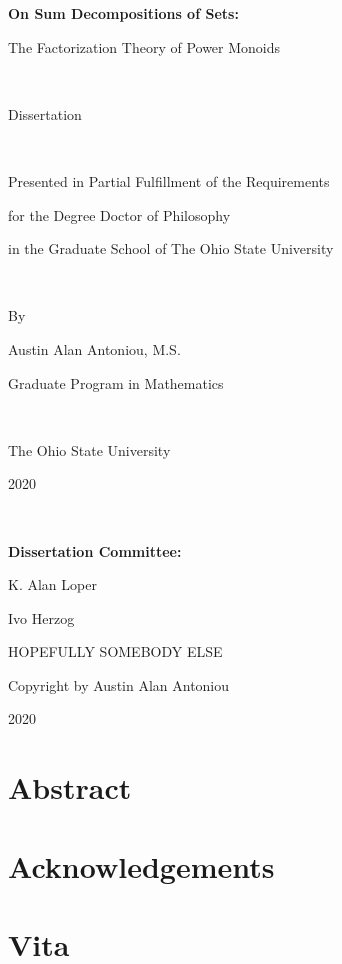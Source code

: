 \documentclass[10pt]{book}
\begin{document}
\frontmatter

\begin{titlepage}
\begin{center}
	{\LARGE \bf On Sum Decompositions of Sets: \\ \vspace{3mm}
		
		The Factorization Theory of Power Monoids}

\

	Dissertation

\
	
	Presented in Partial Fulfillment of the Requirements 
	
	for the Degree Doctor of Philosophy 
	
	in the Graduate School of The Ohio State University

\
		
	By 
	
	{\large Austin Alan Antoniou, M.S. 
	
	Graduate Program in Mathematics}

\
	
	The Ohio State University
	
	2020

\

	{\large {\bf Dissertation Committee:}
	
	K. Alan Loper
	
	Ivo Herzog
	
	HOPEFULLY SOMEBODY ELSE}
\end{center}

\end{titlepage}
\hspace{0pt}
\vfill
\begin{center}
Copyright by Austin Alan Antoniou

2020
\end{center}
\vfill
\pagestyle{empty}
\chapter*{Abstract}

\chapter*{Acknowledgements}

\chapter*{Vita}


\tableofcontents


\mainmatter









%

\newpage
\nocite{*}


\end{document}
